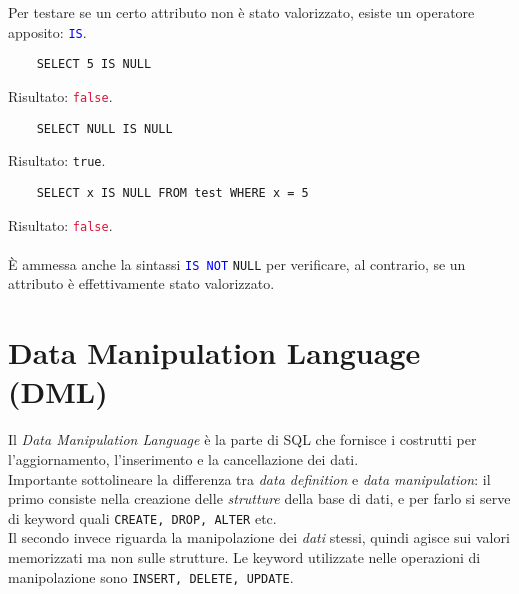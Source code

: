 \documentclass[12pt,a4paper]{book}
\begin{document}
	Per testare se un certo attributo non è stato valorizzato, esiste un operatore apposito: \textcolor{blue}{\texttt{IS}}.
	\begin{lstlisting}
	SELECT 5 IS NULL
	\end{lstlisting}
	Risultato: \textcolor{crimson}{\texttt{false}}.\\
	\begin{lstlisting}
	SELECT NULL IS NULL
	\end{lstlisting}
	Risultato: \textcolor{dkgreen}{\texttt{true}}.\\
	\begin{lstlisting}
	SELECT x IS NULL FROM test WHERE x = 5
	\end{lstlisting}
	Risultato: \textcolor{crimson}{\texttt{false}}.\\\\
	È ammessa anche la sintassi \textcolor{blue}{\texttt{IS NOT}} \texttt{NULL} per verificare, al contrario, se un attributo è effettivamente stato valorizzato.
	\chapter{Data Manipulation Language (DML)}
	Il \textit{Data Manipulation Language} è la parte di SQL che fornisce i costrutti per l'aggiornamento, l'inserimento e la cancellazione dei dati. \\Importante sottolineare la differenza tra \textit{data definition} e \textit{data manipulation}: il primo consiste nella creazione delle \textit{strutture} della base di dati, e per farlo si serve di keyword quali \texttt{CREATE, DROP, ALTER} etc.\\Il secondo invece riguarda la manipolazione dei \textit{dati} stessi, quindi agisce sui valori memorizzati ma non sulle strutture. Le keyword utilizzate nelle operazioni di manipolazione sono \texttt{INSERT, DELETE, UPDATE}.
\end{document}
